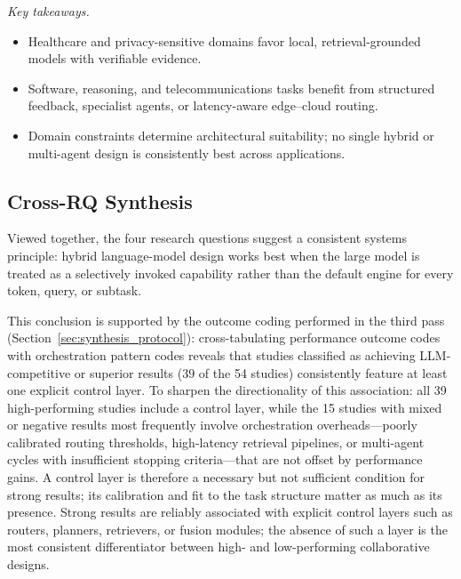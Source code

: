 \begin{samepage}
\smallskip\noindent\textit{Key takeaways.}
\begin{itemize}
    \item Healthcare and privacy-sensitive domains favor local, retrieval-grounded models with verifiable evidence.
    \item Software, reasoning, and telecommunications tasks benefit from structured feedback, specialist agents, or latency-aware edge--cloud routing.
    \item Domain constraints determine architectural suitability; no single hybrid or multi-agent design is consistently best across applications.
\end{itemize}
\end{samepage}

\subsection{Cross-RQ Synthesis}
\label{sec:cross_rq}
Viewed together, the four research questions suggest a consistent systems principle: hybrid language-model design works best when the large model is treated as a selectively invoked capability rather than the default engine for every token, query, or subtask.

This conclusion is supported by the outcome coding performed in the third pass (Section~\ref{sec:synthesis_protocol}): cross-tabulating performance outcome codes with orchestration pattern codes reveals that studies classified as achieving LLM-competitive or superior results (39 of the 54 studies) consistently feature at least one explicit control layer. To sharpen the directionality of this association: all 39 high-performing studies include a control layer, while the 15 studies with mixed or negative results most frequently involve orchestration overheads---poorly calibrated routing thresholds, high-latency retrieval pipelines, or multi-agent cycles with insufficient stopping criteria---that are not offset by performance gains. A control layer is therefore a necessary but not sufficient condition for strong results; its calibration and fit to the task structure matter as much as its presence. Strong results are reliably associated with explicit control layers such as routers, planners, retrievers, or fusion modules; the absence of such a layer is the most consistent differentiator between high- and low-performing collaborative designs.

